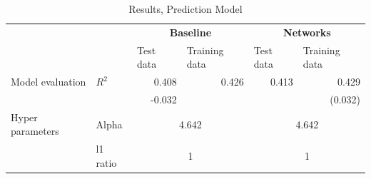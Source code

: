 \begin{table}[htbp]
  \centering
  \caption{Results, Prediction Model}
    \begin{tabular}{rlcccc}
    \hline
          &       & \multicolumn{2}{c}{\textbf{Baseline}} & \multicolumn{2}{c}{\textbf{Networks}} \\ 
          &       & \multicolumn{1}{l}{Test data} & \multicolumn{1}{l}{Training data} & \multicolumn{1}{l}{Test data} & \multicolumn{1}{l}{Training data} \\ \hline
    \multicolumn{1}{l}{Model evaluation} & $R^2$  & \multicolumn{1}{r}{0.408} & \multicolumn{1}{r}{0.426} & \multicolumn{1}{r}{0.413} & \multicolumn{1}{r}{0.429} \\
          &       & \multicolumn{1}{r}{-0.032} &       &       & \multicolumn{1}{r}{(0.032)} \\
    \multicolumn{1}{l}{Hyper parameters} & Alpha & \multicolumn{2}{c}{4.642} & \multicolumn{2}{c}{4.642} \\
          & l1 ratio & \multicolumn{2}{c}{1} & \multicolumn{2}{c}{1} \\ \hline
    \end{tabular}%
  \label{tab:addlabel}%
\end{table}%
